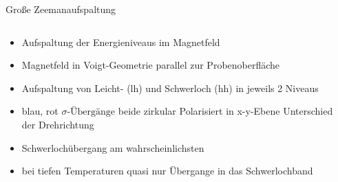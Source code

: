 \begin{frame}{Große Zeemanaufspaltung}
    \pause
    \begin{columns}
        \begin{column}{0.5\textwidth}
            \begin{itemize}
                \item <1-> Aufspaltung der Energieniveaus im Magnetfeld
                \item <3-> Magnetfeld in Voigt-Geometrie \rightarrow parallel zur Probenoberfläche 
                \item <4-> Aufspaltung von Leicht- (lh) und Schwerloch (hh) in jeweils 2 Niveaus
                \item <5-> blau, rot $\sigma \text{-Übergänge}$ \rightarrow beide zirkular Polarisiert in x-y-Ebene 
                \rightarrow Unterschied der Drehrichtung
                \item <6-> Schwerlochübergang am wahrscheinlichsten
                \item <7-> bei tiefen Temperaturen quasi nur Übergange in das Schwerlochband
            \end{itemize}
        \end{column}
        \begin{column}{0.5\textwidth}
            \centering
        \end{column}
    \end{columns}
\end{frame}

